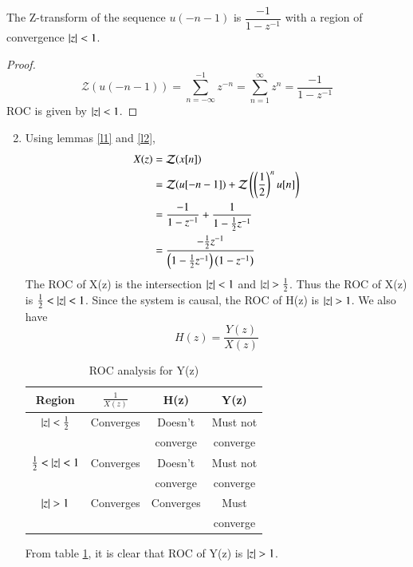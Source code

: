\documentclass[journal,12pt,twocolumn]{IEEEtran}
\begin{document}
\begin{lemma}
The Z-transform of the sequence $u(-n-1)$ is $\dfrac{-1}{1-z^{-1}}$ with a region of convergence $\vert z\vert < 1$.
\label{l2}
\end{lemma}
\begin{proof}
\begin{equation}
    \mathcal{Z}(u(-n-1)) = \sum_{n=-\infty}^{-1}z^{-n} = \sum_{n=1}^{\infty}z^{n} = \dfrac{-1}{1-z^{-1}}
\end{equation}
ROC is given by $\vert z\vert < 1$.
\end{proof}

\begin{enumerate}[label=(\alph*)]
\setcounter{enumi}{1}
    \item Using lemmas \ref{l1} and \ref{l2}, 
\begin{align}
    X(z) &= \mathcal{Z}(x[n])\\
         &= \mathcal{Z}(u[-n-1]) + \mathcal{Z}\left(\left(\dfrac{1}{2}\right)^nu[n]\right)\\
         &= \dfrac{-1}{1-z^{-1}} + \dfrac{1}{1-\frac{1}{2}z^{-1}}\\
         &= \dfrac{-\frac{1}{2}z^{-1}}{\left(1-\frac{1}{2}z^{-1}\right)\left(1-z^{-1}\right)}
\end{align}
The ROC of X(z) is the intersection $\vert z\vert < 1$ and $\vert z\vert > \frac{1}{2}$. Thus the ROC of X(z) is $\frac{1}{2} < \vert z\vert < 1$. Since the system is causal, the ROC of H(z) is $\vert z\vert > 1$. We also have
\begin{equation}
    H(z) = \dfrac{Y(z)}{X(z)}
\end{equation}

\begin{table}[h]
    \centering
    \begin{tabular}{|c|c|c|c|}
    \hline
         Region & $\frac{1}{X(z)}$ & H(z) & Y(z) \\
         \hline
         $\vert z\vert < \frac{1}{2}$ & Converges & Doesn't & Must not \\
         & & converge & converge \\
         \hline
         $\frac{1}{2} < \vert z\vert < 1$ & Converges & Doesn't & Must not \\
         & & converge & converge \\
         \hline
         $\vert z\vert > 1$ & Converges & Converges & Must \\
         & & & converge \\
         \hline
    \end{tabular}
    \caption{ROC analysis for Y(z)}
    \label{analysis}
\end{table}
From table \ref{analysis}, it is clear that ROC of Y(z) is $\vert z\vert > 1$.


\end{enumerate}
\end{document}
